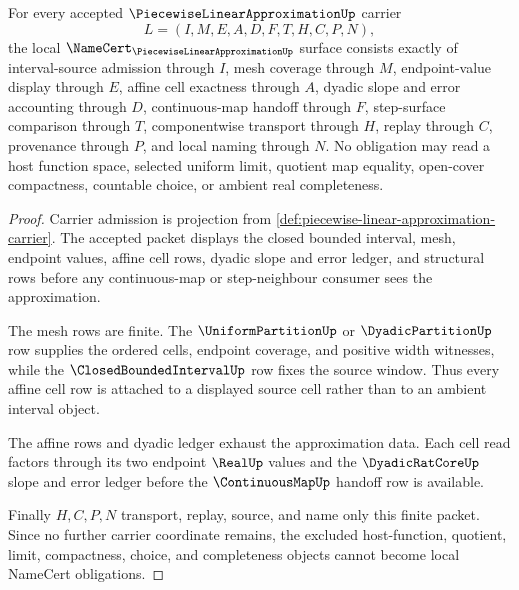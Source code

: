 \begin{theorem}
\label{thm:piecewise-linear-approximation-namecert-obligations}
For every accepted $\PiecewiseLinearApproximationUp$ carrier
$$
L=(I,M,E,A,D,F,T,H,C,P,N),
$$
the local $\NameCert_{\PiecewiseLinearApproximationUp}$ surface consists exactly of interval-source admission through $I$, mesh coverage through $M$, endpoint-value display through $E$, affine cell exactness through $A$, dyadic slope and error accounting through $D$, continuous-map handoff through $F$, step-surface comparison through $T$, componentwise transport through $H$, replay through $C$, provenance through $P$, and local naming through $N$. No obligation may read a host function space, selected uniform limit, quotient map equality, open-cover compactness, countable choice, or ambient real completeness.
\end{theorem}
\begin{proof}
Carrier admission is projection from \autoref{def:piecewise-linear-approximation-carrier}. The accepted packet displays the closed bounded interval, mesh, endpoint values, affine cell rows, dyadic slope and error ledger, and structural rows before any continuous-map or step-neighbour consumer sees the approximation.

The mesh rows are finite. The $\UniformPartitionUp$ or $\DyadicPartitionUp$ row supplies the ordered cells, endpoint coverage, and positive width witnesses, while the $\ClosedBoundedIntervalUp$ row fixes the source window. Thus every affine cell row is attached to a displayed source cell rather than to an ambient interval object.

The affine rows and dyadic ledger exhaust the approximation data. Each cell read factors through its two endpoint $\RealUp$ values and the $\DyadicRatCoreUp$ slope and error ledger before the $\ContinuousMapUp$ handoff row is available.

Finally $H,C,P,N$ transport, replay, source, and name only this finite packet. Since no further carrier coordinate remains, the excluded host-function, quotient, limit, compactness, choice, and completeness objects cannot become local NameCert obligations.
\end{proof}

